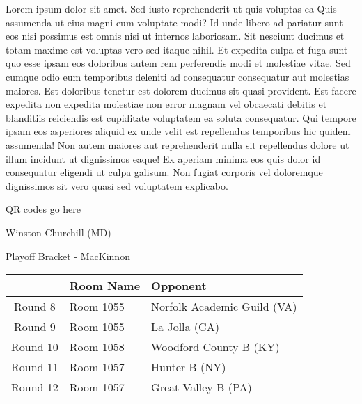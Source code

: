 \documentclass{article}%
\begin{document}
\vspace*{8pt}%
\linebreak%
\newline%
\newline%
Lorem ipsum dolor sit amet. Sed iusto reprehenderit ut quis voluptas ea Quis assumenda ut eius magni eum voluptate modi? Id unde libero ad pariatur sunt eos nisi possimus est omnis nisi ut internos laboriosam. Sit nesciunt ducimus et totam maxime est voluptas vero sed itaque nihil. Et expedita culpa et fuga sunt quo esse ipsam eos doloribus autem rem perferendis modi et molestiae vitae.\newline%
\newline%
Sed cumque odio eum temporibus deleniti ad consequatur consequatur aut molestias maiores. Est doloribus tenetur est dolorem ducimus sit quasi provident. Est facere expedita non expedita molestiae non error magnam vel obcaecati debitis et blanditiis reiciendis est cupiditate voluptatem ea soluta consequatur. Qui tempore ipsam eos asperiores aliquid ex unde velit est repellendus temporibus hic quidem assumenda!\newline%
\newline%
Non autem maiores aut reprehenderit nulla sit repellendus dolore ut illum incidunt ut dignissimos eaque! Ex aperiam minima eos quis dolor id consequatur eligendi ut culpa galisum. Non fugiat corporis vel doloremque dignissimos sit vero quasi sed voluptatem explicabo.\newline%
\newline%
%
\vspace*{30pt}%
\begin{center}%
\begin{Huge}%
QR codes go here%
\end{Huge}%
\end{center}%
\newpage%
\begin{center}%
\begin{Huge}%
Winston Churchill (MD)%
\end{Huge}%
\vspace*{8pt}%
\linebreak%
\begin{Large}%
Playoff Bracket {-} MacKinnon%
\end{Large}%
\end{center}%
%
\begin{tabularx}{\textwidth}{|c|Y|Y|}%
\hline%
&Room Name&Opponent\\%
\hline%
Round 8&Room 1055&Norfolk Academic Guild (VA)\\%
Round 9&Room 1055&La Jolla (CA)\\%
Round 10&Room 1058&Woodford County B (KY)\\%
Round 11&Room 1057&Hunter B (NY)\\%
Round 12&Room 1057&Great Valley B (PA)\\%
\hline%
\end{tabularx}%
\end{document}
